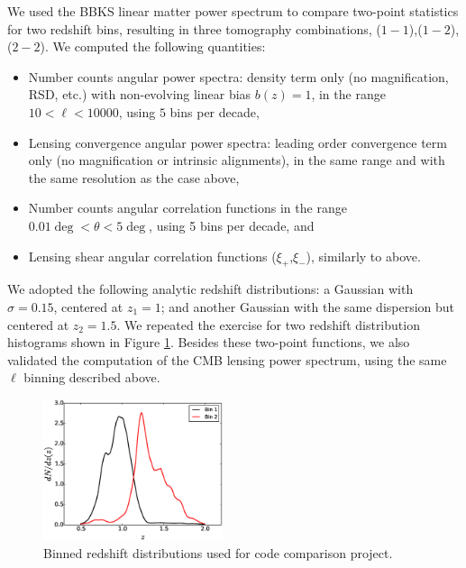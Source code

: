 \documentclass[\docopts]{\docclass}
\begin{document}
We used the BBKS linear matter power spectrum to compare two-point statistics for two redshift bins, resulting in three tomography combinations, ($1-1$),($1-2$),($2-2$). We computed the following quantities:
\begin{itemize}
\item Number counts angular power spectra: density term only (no magnification, RSD, etc.) with non-evolving linear bias $b(z) = 1$, in the range $10 < \ell < 10000$, using $5$ bins per decade,
\item Lensing convergence angular power spectra: leading order convergence term only (no magnification or intrinsic alignments), in the same range and with the same resolution as the case above,
\item Number counts angular correlation functions in the range $0.01 \deg < \theta < 5 \deg$, using 5 bins per decade, and
\item Lensing shear angular correlation functions ($\xi_+$,$\xi_-$), similarly to above.
\end{itemize}
We adopted the following analytic redshift distributions: a Gaussian with $\sigma = 0.15$, centered at $z_1 = 1$; and another Gaussian with the same dispersion but centered at $z_2 = 1.5$. We repeated the exercise for two redshift distribution histograms shown in Figure \ref{fig:zhistos}. Besides these two-point functions, we also validated the computation of the CMB lensing power spectrum, using the same $\ell$ binning described above. 

\begin{figure}
\centering
\includegraphics[width=0.47\textwidth]{zdist.eps}
\caption{Binned redshift distributions used for code comparison project.}
\label{fig:zhistos}
\end{figure}
\end{document}
